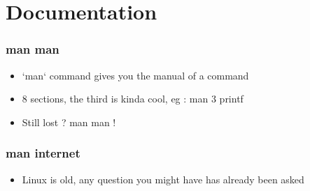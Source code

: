 \section{Documentation}


\begin{frame}
    \frametitle{man man}
    \begin{itemize}
	\item `man` command gives you the manual of a command
	\item 8 sections, the third is kinda cool, eg : man 3 printf
	\item Still lost ? man man !
    \end{itemize}
\end{frame}

\begin{frame}
    \frametitle{man internet}
    \begin{itemize}
	\item Linux is old, any question you might have has already been asked
    \end{itemize}
\end{frame}
